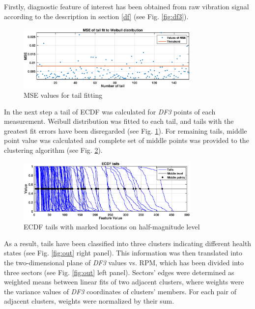 \documentclass[10pt]{article}
\begin{document}
Firstly, diagnostic feature of interest has been obtained from raw vibration signal according to the description in section \ref{df} (see Fig. \ref{fig:df3}).

\begin{figure}[h!]
\centering
\includegraphics[width=0.8\textwidth]{wykresy/mse}
\vspace{-10pt}
\caption{MSE values for tail fitting}
\label{fig:mse}
\vspace{-5pt}
\end{figure}

In the next step a tail of ECDF was calculated for \textit{DF3} points of each measurement. Weibull distribution was fitted to each tail, and tails with the greatest fit errors have been disregarded (see Fig. \ref{fig:mse}). For remaining tails, middle point value was calculated and complete set of middle points was provided to the clustering algorithm (see Fig. \ref{fig:tails}).



\begin{figure}[h!]
\centering
\includegraphics[width=0.8\textwidth]{wykresy/tails}
\vspace{-10pt}
\caption{ECDF tails with marked locations on half-magnitude level}
\label{fig:tails}
\vspace{-5pt}
\end{figure}

As a result, tails have been classified into three clusters indicating different health states (see Fig. \ref{fig:out} right panel). This information was then translated into the two-dimensional plane of \textit{DF3} values vs. RPM, which has been divided into three sectors (see Fig. \ref{fig:out} left panel). Sectors' edges were determined as weighted means between linear fits of two adjacent clusters, where weights were the variance values of \textit{DF3} coordinates of clusters' members. For each pair of adjacent clusters, weights were normalized by their sum.
\end{document}
